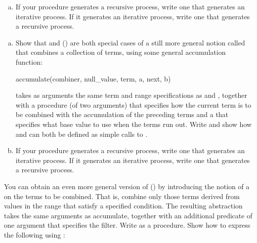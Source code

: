\begin{exerciseGroup}
\begin{enumerate}[a.]
$$ \frac{\pi}{4}
=
\frac{2\cdot 4\cdot 4\cdot 6\cdot 6\cdot 8\cdots}%
{3\cdot 3\cdot 5\cdot 5\cdot 7\cdot 7\cdots}\,. $$

\item
If your  procedure generates a recursive process, write one that
generates an iterative process.  If it generates an iterative process, write
one that generates a recursive process.

\end{enumerate}

\label{Exercise 1.32}
 \begin{enumerate}[a.]

\item
Show that  and  () are both special
cases of a still more general notion called  that combines a
collection of terms, using some general accumulation function:

\begin{syntaxForm}
accumulate(combiner, null_value, term, a, next, b)
\end{syntaxForm}

 takes as arguments the same term and range specifications as
 and , together with a  procedure (of
two arguments) that specifies how the current term is to be combined with the
accumulation of the preceding terms and a  that specifies what
base value to use when the terms run out.  Write  and show how
 and  can both be defined as simple calls to
.

\item
If your  procedure generates a recursive process, write one
that generates an iterative process.  If it generates an iterative process,
write one that generates a recursive process.

\end{enumerate}

\label{Exercise 1.33}
 You can obtain an even more
general version of  () by introducing the
notion of a  on the terms to be combined.  That is, combine
only those terms derived from values in the range that satisfy a specified
condition.  The resulting  abstraction takes the same
arguments as accumulate, together with an additional predicate of one argument
that specifies the filter.  Write  as a procedure.
Show how to express the following using :


\end{exerciseGroup}

